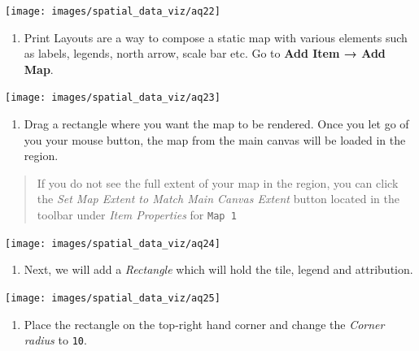 \documentclass[
  12pt,
  a4paper]{article}
\providecommand{\tightlist}{%
  \setlength{\itemsep}{0pt}\setlength{\parskip}{0pt}}
\begin{document}
\begin{center}\texttt{[image: images/spatial\_data\_viz/aq22]} \end{center}

\begin{enumerate}
\def\labelenumi{\arabic{enumi}.}
\setcounter{enumi}{22}
\tightlist
\item
  Print Layouts are a way to compose a static map with various elements
  such as labels, legends, north arrow, scale bar etc. Go to \textbf{Add
  Item → Add Map}.
\end{enumerate}

\begin{center}\texttt{[image: images/spatial\_data\_viz/aq23]} \end{center}

\begin{enumerate}
\def\labelenumi{\arabic{enumi}.}
\setcounter{enumi}{23}
\tightlist
\item
  Drag a rectangle where you want the map to be rendered. Once you let
  go of you your mouse button, the map from the main canvas will be
  loaded in the region.
\end{enumerate}

\begin{quote}
If you do not see the full extent of your map in the region, you can
click the \emph{Set Map Extent to Match Main Canvas Extent} button
located in the toolbar under \emph{Item Properties} for \texttt{Map\ 1}
\end{quote}

\begin{center}\texttt{[image: images/spatial\_data\_viz/aq24]} \end{center}

\begin{enumerate}
\def\labelenumi{\arabic{enumi}.}
\setcounter{enumi}{24}
\tightlist
\item
  Next, we will add a \emph{Rectangle} which will hold the tile, legend
  and attribution.
\end{enumerate}

\begin{center}\texttt{[image: images/spatial\_data\_viz/aq25]} \end{center}

\begin{enumerate}
\def\labelenumi{\arabic{enumi}.}
\setcounter{enumi}{25}
\tightlist
\item
  Place the rectangle on the top-right hand corner and change the
  \emph{Corner radius} to \texttt{10}.
\end{enumerate}
\end{document}
